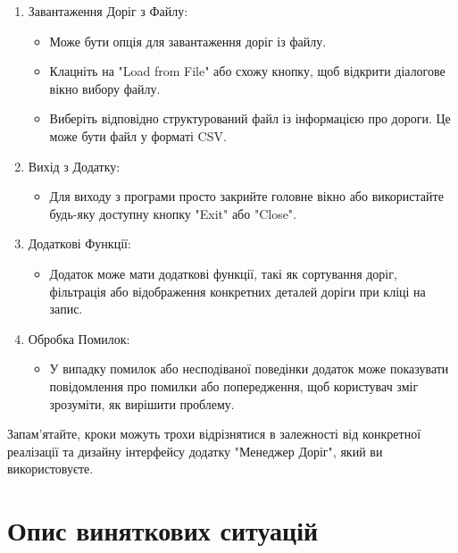 \documentclass[14pt]{extarticle}
\begin{document}
\begin{enumerate}
\item    Завантаження Доріг з Файлу:
        \begin{itemize}
        \item Може бути опція для завантаження доріг із файлу.
        \item Клацніть на "Load from File" або схожу кнопку, щоб відкрити діалогове вікно вибору файлу.
        \item Виберіть відповідно структурований файл із інформацією про дороги. Це може бути файл у форматі CSV.
        \end{itemize}

\item    Вихід з Додатку:
        \begin{itemize}
        \item Для виходу з програми просто закрийте головне вікно або використайте будь-яку доступну кнопку "Exit" або "Close".
        \end{itemize}

\item    Додаткові Функції:
        \begin{itemize}
        \item Додаток може мати додаткові функції, такі як сортування доріг, фільтрація або відображення конкретних деталей доріги при кліці на запис.
        \end{itemize}

\item    Обробка Помилок:
        \begin{itemize}
        \item У випадку помилок або несподіваної поведінки додаток може показувати повідомлення про помилки або попередження, щоб користувач зміг зрозуміти, як вирішити проблему.
        \end{itemize}
\end{enumerate}

Запам'ятайте, кроки можуть трохи відрізнятися в залежності від конкретної реалізації та дизайну інтерфейсу додатку "Менеджер Доріг", який ви використовуєте.

\section{Опис виняткових ситуацій}
\end{document}
